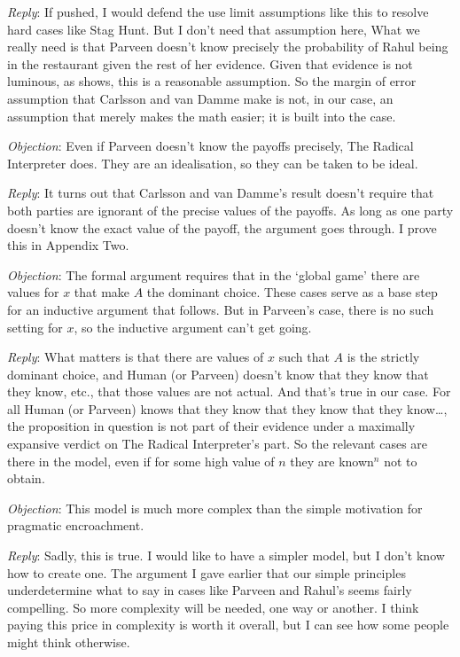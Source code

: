 \documentclass{article}
\begin{document}
\emph{Reply}: If pushed, I would defend the use limit assumptions like this to resolve hard cases like Stag Hunt. But I don't need that assumption here, What we really need is that Parveen doesn't know precisely the probability of Rahul being in the restaurant given the rest of her evidence. Given that evidence is not luminous, as \citet{Williamson2000} shows, this is a reasonable assumption. So the margin of error assumption that Carlsson and van Damme make is not, in our case, an assumption that merely makes the math easier; it is built into the case.

\emph{Objection}: Even if Parveen doesn't know the payoffs precisely, The Radical Interpreter does. They are an idealisation, so they can be taken to be ideal.

\emph{Reply}: It turns out that Carlsson and van Damme's result doesn't require that both parties are ignorant of the precise values of the payoffs. As long as one party doesn't know the exact value of the payoff, the argument goes through. I prove this in Appendix Two.

\emph{Objection}: The formal argument requires that in the `global game' there are values for $x$ that make $A$ the dominant choice. These cases serve as a base step for an inductive argument that follows. But in Parveen's case, there is no such setting for $x$, so the inductive argument can't get going.

\emph{Reply}: What matters is that there are values of $x$ such that $A$ is the strictly dominant choice, and Human (or Parveen) doesn't know that they know that they know, etc., that those values are not actual. And that's true in our case. For all Human (or Parveen) knows that they know that they know that they know{\ldots}, the proposition in question is not part of their evidence under a maximally expansive verdict on The Radical Interpreter's part. So the relevant cases are there in the model, even if for some high value of $n$ they are known$^n$ not to obtain.

\emph{Objection}: This model is much more complex than the simple motivation for pragmatic encroachment.

\emph{Reply}: Sadly, this is true. I would like to have a simpler model, but I don't know how to create one. The argument I gave earlier that our simple principles underdetermine what to say in cases like Parveen and Rahul's seems fairly compelling. So more complexity will be needed, one way or another. I think paying this price in complexity is worth it overall, but I can see how some people might think otherwise.
\end{document}
